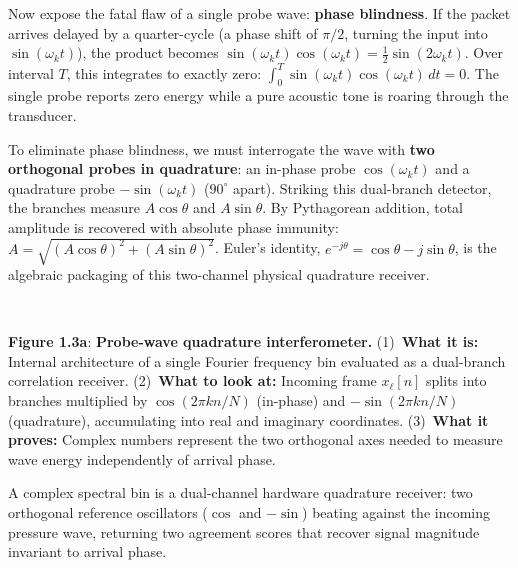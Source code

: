 \documentclass[11pt,a4paper]{article}
\begin{document}
Now expose the fatal flaw of a single probe wave: \textbf{phase blindness}. If the packet arrives delayed by a quarter-cycle (a phase shift of $\pi/2$, turning the input into $\sin(\omega_k t)$), the product becomes $\sin(\omega_k t)\cos(\omega_k t) = \frac{1}{2}\sin(2\omega_k t)$. Over interval $T$, this integrates to exactly zero: $\int_0^T \sin(\omega_k t) \cos(\omega_k t) \, dt = 0$. The single probe reports zero energy while a pure acoustic tone is roaring through the transducer.

To eliminate phase blindness, we must interrogate the wave with \textbf{two orthogonal probes in quadrature}: an in-phase probe $\cos(\omega_k t)$ and a quadrature probe $-\sin(\omega_k t)$ ($90^\circ$ apart). Striking this dual-branch detector, the branches measure $A \cos\theta$ and $A \sin\theta$. By Pythagorean addition, total amplitude is recovered with absolute phase immunity: $A = \sqrt{(A\cos\theta)^2 + (A\sin\theta)^2}$. Euler's identity, $e^{-j\theta} = \cos\theta - j\sin\theta$, is the algebraic packaging of this two-channel physical quadrature receiver.

\vspace{-3.5mm}
\begin{center}
\begin{minipage}{\textwidth}
\centering
\resizebox{0.94\textwidth}{!}{}\\[0.5mm]
\begin{minipage}{0.96\textwidth}
\small\textbf{Figure 1.3a}: \textbf{Probe-wave quadrature interferometer.} (1)~\textbf{What it is:} Internal architecture of a single Fourier frequency bin evaluated as a dual-branch correlation receiver. (2)~\textbf{What to look at:} Incoming frame $x_\ell[n]$ splits into branches multiplied by $\cos(2\pi kn/N)$ (in-phase) and $-\sin(2\pi kn/N)$ (quadrature), accumulating into real and imaginary coordinates. (3)~\textbf{What it proves:} Complex numbers represent the two orthogonal axes needed to measure wave energy independently of arrival phase.
\end{minipage}
\end{minipage}
\end{center}
\vspace{-3.5mm}

\begin{groundbreaking}
A complex spectral bin is a dual-channel hardware quadrature receiver: two orthogonal reference oscillators ($\cos$ and $-\!\sin$) beating against the incoming pressure wave, returning two agreement scores that recover signal magnitude invariant to arrival phase.
\end{groundbreaking}
\end{document}
